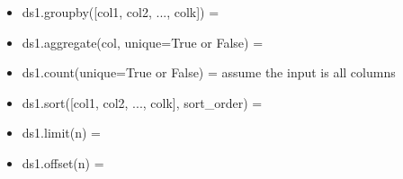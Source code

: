 \begin{itemize}
    \item ds1.groupby([col1, col2, ..., colk]) = 
\end{itemize}{}


\begin{itemize}
    \item ds1.aggregate(col, unique=True or False) = 
\end{itemize}{}

\begin{itemize}
    \item ds1.count(unique=True or False) = assume the input is all columns
\end{itemize}{}


\begin{itemize}
    \item ds1.sort([col1, col2, ..., colk], sort\_order) =
\end{itemize}{}


\begin{itemize}
    \item ds1.limit(n) =
\end{itemize}{}

\begin{itemize}
    \item ds1.offset(n) =
\end{itemize}{}
